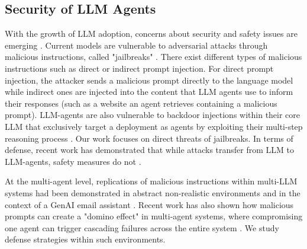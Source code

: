 \subsection{Security of LLM Agents}
With the growth of LLM adoption, concerns about security and safety issues are emerging \citep{li2023privacy,wei2023jailbroken}.
Current models are vulnerable to adversarial attacks through malicious instructions, called "jailbreaks" \citep{wei2023jailbroken}. There exist different types of malicious instructions such as direct \citep{liu2024prompt} or indirect \citep{greshake2023youve} prompt injection. For direct prompt injection, the attacker sends a malicious prompt directly to the language model while indirect ones are injected into the content that LLM agents use to inform their responses (such as a website an agent retrieves containing a malicious prompt). LLM-agents are also vulnerable to backdoor injections within their core LLM that exclusively target a deployment as agents by exploiting their multi-step reasoning process \citep{yang2024watchagentsinvestigatingbackdoor}. Our work focuses on direct threats of jailbreaks.
In terms of defense, recent work has demonstrated that while attacks transfer from LLM to LLM-agents, safety measures do not \citep{andriushchenko2024agentharm, lermen2024applying, kumar2024refusal}.  

At the multi-agent level, replications of malicious instructions within multi-LLM systems had been demonstrated in abstract non-realistic environments \citep{gu2024agentsmithsingleimage} and in the context of a GenAI email assistant \citep{cohen2024comesaiwormunleashing}. Recent work has also shown how malicious prompts can create a "domino effect" in multi-agent systems, where compromising one agent can trigger cascading failures across the entire system \citep{tian2024evilgeniusesdelvingsafety}. We study defense strategies within such environments.

